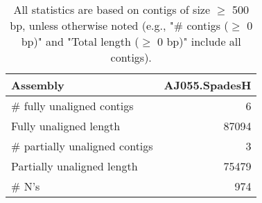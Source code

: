 \documentclass[12pt,a4paper]{article}
\begin{document}
\begin{table}[ht]
\begin{center}
\caption{All statistics are based on contigs of size $\geq$ 500 bp, unless otherwise noted (e.g., "\# contigs ($\geq$ 0 bp)" and "Total length ($\geq$ 0 bp)" include all contigs).}
\begin{tabular}{|l*{1}{|r}|}
\hline
Assembly & AJ055.SpadesH \\ \hline
\# fully unaligned contigs & 6 \\ \hline
Fully unaligned length & 87094 \\ \hline
\# partially unaligned contigs & 3 \\ \hline
Partially unaligned length & 75479 \\ \hline
\# N's & 974 \\ \hline
\end{tabular}
\end{center}
\end{table}
\end{document}
